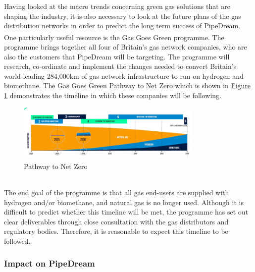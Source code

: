 \documentclass[11pt]{article}		%
\newcommand{\supercite}[1]{\textsuperscript{\cite{#1}}}		%
\newcommand{\figref}[1]{\hyperref[#1]{Figure \ref*{#1}}}    %
\begin{document}
    		Having looked at the macro trends concerning green gas solutions that are shaping the industry, it is also necessary to look at the future plans of the gas distribution networks in order to predict the long term success of PipeDream.
    		\\
        	\hspace*{2ex}One particularly useful resource is the Gas Goes Green programme\supercite{gasgoesgreen}. The programme brings together all four of Britain’s gas network companies, who are also the customers that PipeDream will be targeting. The programme will research, co-ordinate and implement the changes needed to convert Britain’s world-leading 284,000km of gas network infrastructure to run on hydrogen and biomethane. The Gas Goes Green Pathway to Net Zero which is shown in \figref{forecast} demonstrates the timeline in which these companies will be following.
    		\begin{figure}[h]
    			\centering
    			\includegraphics[width = 0.8\textwidth]{futureforecaset.jpg}
    			\caption{Pathway to Net Zero\supercite{gasgoesgreen} }	
    			\label{forecast}
    		\end{figure}
    		\\
            \hspace*{2ex}The end goal of the programme is that all gas end-users are supplied with hydrogen and/or biomethane, and natural gas is no longer used. Although it is difficult to predict whether this timeline will be met, the programme has set out clear deliverables through close consultation with the gas distributors and regulatory bodies. Therefore, it is reasonable to expect this timeline to be followed. 
            
    		\subsubsection[Impact on PipeDream]{Impact on PipeDream}
    		
\end{document}
